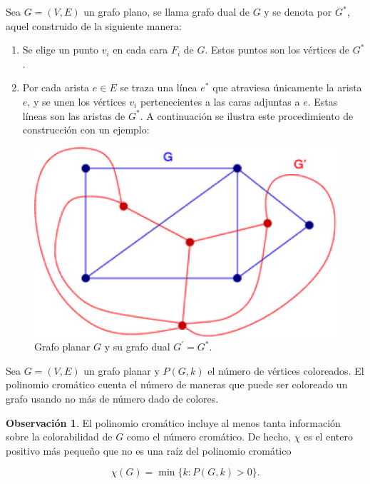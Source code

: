 \documentclass[spanish, utf8,handout]{beamer} %
\theoremstyle{definition}
\newtheorem{remark}{Observación}
\begin{document}
\begin{frame}[allowframebreaks]
\begin{example}
	Sea $G=(V,E)$ un grafo plano, se llama grafo dual de $G$ y se denota por $G^{\ast}$, aquel construido de la siguiente manera:
	
	\begin{enumerate}
		\item Se elige un punto $v_i$ en cada cara $F_i$ de $G$. Estos puntos son los vértices de $G^{\ast}$.
		
		\item Por cada arista $e\in E$ se traza una línea $e^{\ast}$ que atraviesa únicamente la arista $e$, y se unen los vértices $v_i$ pertenecientes a las caras adjuntas a $e$. Estas líneas son las aristas de $G^{\ast}$. A continuación se ilustra este procedimiento de construcción con un ejemplo:
	\end{enumerate}
\end{example}

\begin{figure}[H]
	\captionsetup{justification=centering,margin=0.5cm}
	\centering
	\includegraphics{example3}
	\caption{Grafo planar $G$ y	su grafo dual $G^{\prime}=G^{\ast}$.}
\end{figure}

\begin{definition}
Sea $G=(V,E)$ un grafo planar y $P(G,k)$ el número de vértices coloreados. El polinomio cromático cuenta el número de maneras que puede ser coloreado un grafo usando no más de número dado de colores.
\end{definition}

\begin{remark}
El polinomio cromático incluye al menos tanta información sobre la colorabilidad de $G$ como el número cromático. De hecho, $\chi$ es el entero positivo más pequeño que no es una raíz del polinomio cromático

\begin{equation*}
\chi(G)=\min\{k\colon P(G,k)>0\}.
\end{equation*}
\end{remark}

\end{frame}
\end{document}
